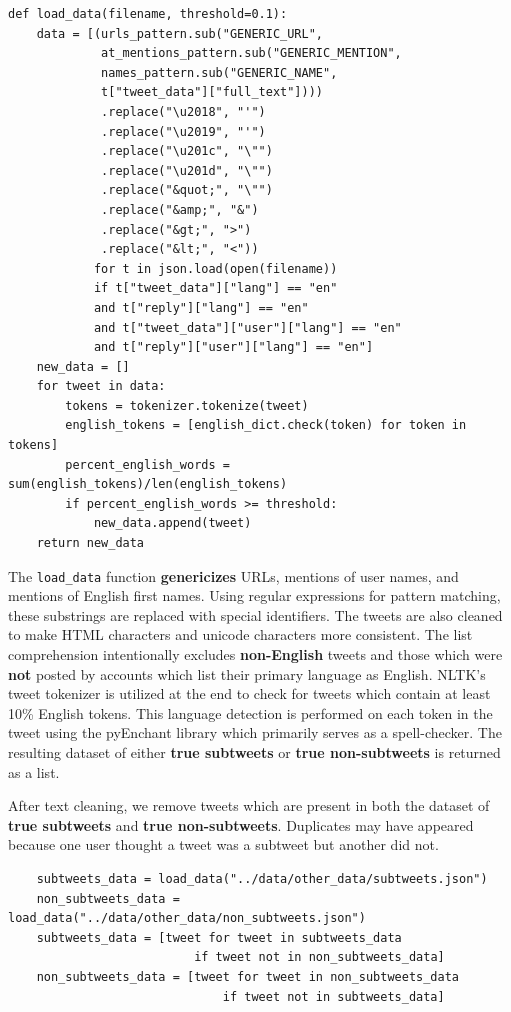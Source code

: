 \documentclass[11pt, twoside, reqno]{book}
\begin{document}
\begin{verbatim}
def load_data(filename, threshold=0.1):
    data = [(urls_pattern.sub("GENERIC_URL",
             at_mentions_pattern.sub("GENERIC_MENTION",
             names_pattern.sub("GENERIC_NAME",
             t["tweet_data"]["full_text"])))
             .replace("\u2018", "'")
             .replace("\u2019", "'")
             .replace("\u201c", "\"")
             .replace("\u201d", "\"")
             .replace("&quot;", "\"")
             .replace("&amp;", "&")
             .replace("&gt;", ">")
             .replace("&lt;", "<"))
            for t in json.load(open(filename))
            if t["tweet_data"]["lang"] == "en"
            and t["reply"]["lang"] == "en"
            and t["tweet_data"]["user"]["lang"] == "en"
            and t["reply"]["user"]["lang"] == "en"]
    new_data = []
    for tweet in data:
        tokens = tokenizer.tokenize(tweet)
        english_tokens = [english_dict.check(token) for token in tokens]
        percent_english_words = sum(english_tokens)/len(english_tokens)
        if percent_english_words >= threshold:
            new_data.append(tweet)
    return new_data
\end{verbatim}
\noindent
The \verb|load_data| function \textbf{genericizes} URLs, mentions of user names, and mentions of English first names. Using regular expressions for pattern matching, these substrings are replaced with special identifiers. The tweets are also cleaned to make HTML characters and unicode characters more consistent. The list comprehension intentionally excludes \textbf{non-English} tweets and those which were \textbf{not} posted by accounts which list their primary language as English. NLTK's tweet tokenizer is utilized at the end to check for tweets which contain at least 10\% English tokens. This language detection is performed on each token in the tweet using the pyEnchant library \cite{pyenchant} which primarily serves as a spell-checker. The resulting dataset of either \textbf{true subtweets} or \textbf{true non-subtweets} is returned as a list.

After text cleaning, we remove tweets which are present in both the dataset of \textbf{true subtweets} and \textbf{true non-subtweets}. Duplicates may have appeared because one user thought a tweet was a subtweet but another did not.

\begin{verbatim}
	subtweets_data = load_data("../data/other_data/subtweets.json")
	non_subtweets_data = load_data("../data/other_data/non_subtweets.json")
	subtweets_data = [tweet for tweet in subtweets_data
                          if tweet not in non_subtweets_data]
	non_subtweets_data = [tweet for tweet in non_subtweets_data
                              if tweet not in subtweets_data]
\end{verbatim}
\end{document}
